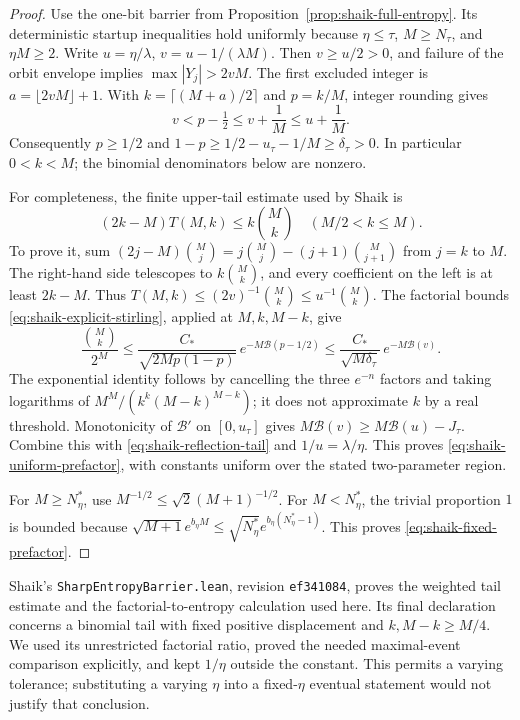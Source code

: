\documentclass[11pt]{article}
\theoremstyle{remark}\newtheorem{remark}[proposition]{Remark}
\begin{document}
\begin{proof}
Use the one-bit barrier from Proposition~\ref{prop:shaik-full-entropy}.
Its deterministic startup inequalities hold uniformly because
\(\eta\le\tau\), \(M\ge N_\tau\), and \(\eta M\ge2\).
Write \(u=\eta/\lambda\), \(v=u-1/(\lambda M)\).
Then \(v\ge u/2>0\), and failure of the orbit envelope implies
\(\max|Y_j|>2vM\). The first excluded integer is
\(a=\lfloor2vM\rfloor+1\). With
\(k=\lceil(M+a)/2\rceil\) and \(p=k/M\), integer rounding gives
\[
 v<p-\tfrac12\le v+\frac1M\le u+\frac1M .
\]
Consequently \(p\ge1/2\) and
\(1-p\ge1/2-u_\tau-1/M\ge\delta_\tau>0\).
In particular \(0<k<M\); the binomial denominators below are nonzero.

For completeness, the finite upper-tail estimate used by Shaik is
\[
 (2k-M)T(M,k)\le k\binom Mk \quad(M/2<k\le M).
\]
To prove it, sum
\((2j-M)\binom Mj=j\binom Mj-(j+1)\binom M{j+1}\)
from \(j=k\) to \(M\). The right-hand side telescopes to
\(k\binom Mk\), and every coefficient on the left is at least \(2k-M\).
Thus \(T(M,k)\le(2v)^{-1}\binom Mk\le u^{-1}\binom Mk\).
The factorial bounds \eqref{eq:shaik-explicit-stirling}, applied at
\(M,k,M-k\), give
\[
 \frac{\binom Mk}{2^M}
 \le \frac{C_*}{\sqrt{2Mp(1-p)}}\,
       e^{-M\mathcal B(p-1/2)}
 \le \frac{C_*}{\sqrt{M\delta_\tau}}\,
       e^{-M\mathcal B(v)} .
\]
The exponential identity follows by cancelling the three \(e^{-n}\)
factors and taking logarithms of \(M^M/(k^k(M-k)^{M-k})\);
it does not approximate \(k\) by a real threshold.
Monotonicity of \(\mathcal B'\) on \([0,u_\tau]\) gives
\(M\mathcal B(v)\ge M\mathcal B(u)-J_\tau\).
Combine this with \eqref{eq:shaik-reflection-tail} and \(1/u=\lambda/\eta\).
This proves \eqref{eq:shaik-uniform-prefactor}, with constants uniform
over the stated two-parameter region.

For \(M\ge N_\eta^*\), use
\(M^{-1/2}\le\sqrt2(M+1)^{-1/2}\).
For \(M<N_\eta^*\), the trivial proportion \(1\) is bounded because
\(\sqrt{M+1}e^{b_\eta M}\le
\sqrt{N_\eta^*}e^{b_\eta(N_\eta^*-1)}\).
This proves \eqref{eq:shaik-fixed-prefactor}.
\end{proof}

Shaik's \texttt{SharpEntropyBarrier.lean}, revision
\texttt{ef341084}, proves the weighted tail estimate and the
factorial-to-entropy calculation used here. Its final declaration
concerns a binomial tail with fixed positive displacement and
\(k,M-k\ge M/4\). We used its unrestricted factorial ratio, proved
the needed maximal-event comparison explicitly, and kept
\(1/\eta\) outside the constant. This permits a varying tolerance;
substituting a varying \(\eta\) into a fixed-\(\eta\) eventual statement
would not justify that conclusion.
\end{document}
